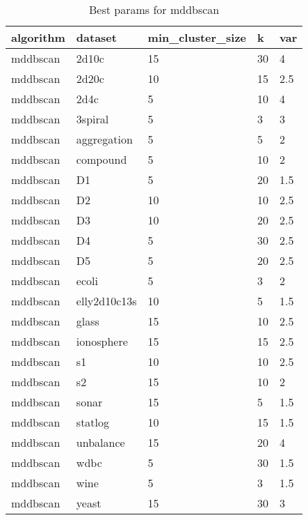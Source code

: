 \begin{table}[H]
\centering
\caption{Best params for mddbscan}
\label{S34_Table}
\begin{tabular}{|l|l|l|l|l|}
\hline
algorithm & dataset & min\_cluster\_size & k & var \\
\hline
mddbscan & 2d10c & 15 & 30 & 4 \\
\hline
mddbscan & 2d20c & 10 & 15 & 2.5 \\
\hline
mddbscan & 2d4c & 5 & 10 & 4 \\
\hline
mddbscan & 3spiral & 5 & 3 & 3 \\
\hline
mddbscan & aggregation & 5 & 5 & 2 \\
\hline
mddbscan & compound & 5 & 10 & 2 \\
\hline
mddbscan & D1 & 5 & 20 & 1.5 \\
\hline
mddbscan & D2 & 10 & 10 & 2.5 \\
\hline
mddbscan & D3 & 10 & 20 & 2.5 \\
\hline
mddbscan & D4 & 5 & 30 & 2.5 \\
\hline
mddbscan & D5 & 5 & 20 & 2.5 \\
\hline
mddbscan & ecoli & 5 & 3 & 2 \\
\hline
mddbscan & elly2d10c13s & 10 & 5 & 1.5 \\
\hline
mddbscan & glass & 15 & 10 & 2.5 \\
\hline
mddbscan & ionosphere & 15 & 15 & 2.5 \\
\hline
mddbscan & s1 & 10 & 10 & 2.5 \\
\hline
mddbscan & s2 & 15 & 10 & 2 \\
\hline
mddbscan & sonar & 15 & 5 & 1.5 \\
\hline
mddbscan & statlog & 10 & 15 & 1.5 \\
\hline
mddbscan & unbalance & 15 & 20 & 4 \\
\hline
mddbscan & wdbc & 5 & 30 & 1.5 \\
\hline
mddbscan & wine & 5 & 3 & 1.5 \\
\hline
mddbscan & yeast & 15 & 30 & 3 \\
\hline
\end{tabular}
\end{table}

\clearpage

